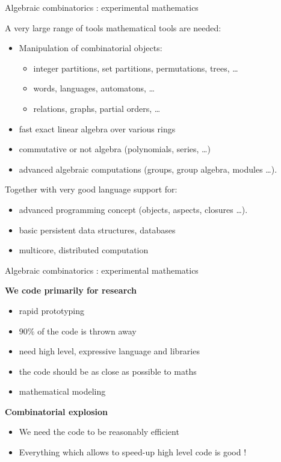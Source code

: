 \documentclass[compress,11pt]{beamer}
\begin{document}
\begin{frame}{Algebraic combinatorics : experimental mathematics}

A very large range of tools mathematical tools are needed:
\begin{itemize}
\item Manipulation of combinatorial objects:
  \begin{itemize}
  \item integer partitions, set partitions, permutations, trees, \dots
  \item words, languages, automatons, \dots
  \item relations, graphs, partial orders, \dots
  \end{itemize}
\item fast exact linear algebra over various rings
\item commutative or not algebra (polynomials, series, \dots)
\item advanced algebraic computations (groups, group algebra, modules \dots).
\end{itemize}
\bigskip\pause

Together with very good language support for:
\begin{itemize}
\item advanced programming concept (objects, aspects, closures \dots).
\item basic persistent data structures, databases
\item multicore, distributed computation
\end{itemize}
\end{frame}

\begin{frame}{Algebraic combinatorics : experimental mathematics}

\textbf{\Large We code primarily for research}
\begin{itemize}
\item rapid prototyping
\item $90\%$ of the code is thrown away
\bigskip\pause
\item need high level, expressive language and libraries
\item the code should be as close as possible to maths
\item mathematical modeling
\end{itemize}
\bigskip\pause
\textbf{\Large Combinatorial explosion}
\begin{itemize}
\item We need the code to be reasonably efficient
\item Everything which allows to speed-up high level code is good !
\end{itemize}
\end{frame}
\end{document}
